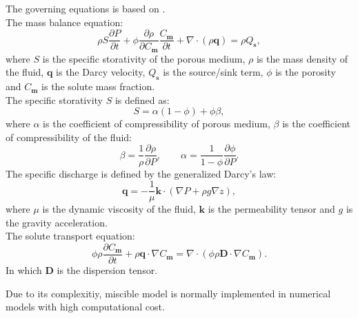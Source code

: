 \documentclass[review]{elsarticle}
\newcommand{\mbf}[1]{{\mathbf{#1}}}%
\begin{document}
The governing equations is based on \cite{ackerer1999modeling}. \\
The mass balance equation: 
\begin{equation}\label{eq:mass_conserv}
\rho S\frac{\partial P}{\partial t} + \phi \frac{\partial \rho}{\partial C_\mbf{m}}\frac{C_\mbf{m}}{\partial t} + \nabla\cdot(\rho\mbf{q}) = \rho Q_\mbf{s},
\end{equation}
where $S$ is the specific storativity of the porous medium, $\rho$ is the mass density of the fluid, $\mbf{q}$ is the Darcy velocity, $Q_\mbf{s}$ is the source/sink term, $\phi$ is the porosity and $C_\mbf{m}$ is the solute mass fraction. \\
The specific storativity $S$ is defined as:
\begin{equation}\label{eq:specific_S}
S = \alpha (1 - \phi) + \phi \beta,
\end{equation} 
where $\alpha$ is the coefficient of compressibility of porous medium, $\beta$ is the coefficient of compressibility of the fluid:
\begin{equation}\label{eq:beta_alpha}
\beta = \frac{1}{\rho}\frac{\partial \rho}{\partial P}, \qquad \alpha = \frac{1}{1 - \phi}\frac{\partial \phi}{\partial P}.
\end{equation}
The specific discharge is defined by the generalized Darcy's law:
\begin{equation}\label{eq:darcy_velocity}
\mbf{q} = - \frac{1}{\mu}\mbf{k}\cdot(\nabla P + \rho g \nabla z),
\end{equation}
where $\mu$ is the dynamic viscosity of the fluid, $\mbf{k}$ is the permeability tensor and $g$ is the gravity acceleration. \\
The solute transport equation:
\begin{equation}
\phi \rho \frac{\partial C_\mbf{m}}{\partial t} + \rho \mbf{q}\cdot\nabla C_\mbf{m} = \nabla\cdot(\phi \rho \mbf{D}\cdot\nabla C_\mbf{m}).
\end{equation}
In which $\mbf{D}$ is the dispersion tensor. \par
Due to its complexitiy, miscible model is normally implemented in numerical models with high computational cost. 
\end{document}
